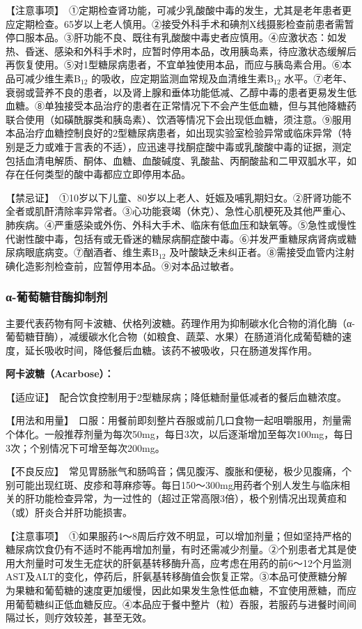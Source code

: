 【注意事项】　①定期检查肾功能，可减少乳酸酸中毒的发生，尤其是老年患者更应定期检查。65岁以上老人慎用。②接受外科手术和碘剂X线摄影检查前患者需暂停口服本品。③肝功能不良、既往有乳酸酸中毒史者应慎用。④应激状态：如发热、昏迷、感染和外科手术时，应暂时停用本品，改用胰岛素，待应激状态缓解后再恢复使用。⑤对1型糖尿病患者，不宜单独使用本品，而应与胰岛素合用。⑥本品可减少维生素B$_{12}$
的吸收，应定期监测血常规及血清维生素B$_{12}$
水平。⑦老年、衰弱或营养不良的患者，以及肾上腺和垂体功能低减、乙醇中毒的患者更易发生低血糖。⑧单独接受本品治疗的患者在正常情况下不会产生低血糖，但与其他降糖药联合使用（如磺酰脲类和胰岛素）、饮酒等情况下会出现低血糖，须注意。⑨服用本品治疗血糖控制良好的2型糖尿病患者，如出现实验室检验异常或临床异常（特别是乏力或难于言表的不适），应迅速寻找酮症酸中毒或乳酸酸中毒的证据，测定包括血清电解质、酮体、血糖、血酸碱度、乳酸盐、丙酮酸盐和二甲双胍水平，如存在任何类型的酸中毒都应立即停用本品。

【禁忌证】　①10岁以下儿童、80岁以上老人、妊娠及哺乳期妇女。②肝肾功能不全者或肌酐清除率异常者。③心功能衰竭（休克）、急性心肌梗死及其他严重心、肺疾病。④严重感染或外伤、外科大手术、临床有低血压和缺氧等。⑤急性或慢性代谢性酸中毒，包括有或无昏迷的糖尿病酮症酸中毒。⑥并发严重糖尿病肾病或糖尿病眼底病变。⑦酗酒者、维生素B$_{12}$
及叶酸缺乏未纠正者。⑧需接受血管内注射碘化造影剂检查前，应暂停用本品。⑨对本品过敏者。

\subsubsection{α-葡萄糖苷酶抑制剂}

主要代表药物有阿卡波糖、伏格列波糖。药理作用为抑制碳水化合物的消化酶（α-葡萄糖苷酶），减缓碳水化合物（如粮食、蔬菜、水果）在肠道消化成葡萄糖的速度，延长吸收时间，降低餐后血糖。该药不被吸收，只在肠道发挥作用。

\textbf{阿卡波糖（Acarbose）：}

【适应证】　配合饮食控制用于2型糖尿病；降低糖耐量低减者的餐后血糖浓度。

【用法和用量】　口服：用餐前即刻整片吞服或前几口食物一起咀嚼服用，剂量需个体化。一般推荐剂量为每次50mg，每日3次，以后逐渐增加至每次100mg，每日3次；个别情况下可增至每次200mg。

【不良反应】　常见胃肠胀气和肠鸣音；偶见腹泻、腹胀和便秘，极少见腹痛，个别可能出现红斑、皮疹和荨麻疹等。每日150～300mg用药者个别人发生与临床相关的肝功能检查异常，为一过性的（超过正常高限3倍），极个别情况出现黄疸和（或）肝炎合并肝功能损害。

【注意事项】　①如果服药4～8周后疗效不明显，可以增加剂量；但如坚持严格的糖尿病饮食仍有不适时不能再增加剂量，有时还需减少剂量。②个别患者尤其是使用大剂量时可发生无症状的肝氨基转移酶升高，应考虑在用药的前6～12个月监测AST及ALT的变化，停药后，肝氨基转移酶值会恢复正常。③本品可使蔗糖分解为果糖和葡萄糖的速度更加缓慢，因此如果发生急性低血糖，不宜使用蔗糖，而应用葡萄糖纠正低血糖反应。④本品应于餐中整片（粒）吞服，若服药与进餐时间间隔过长，则疗效较差，甚至无效。

